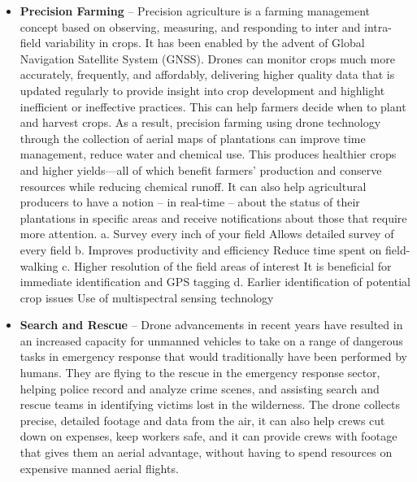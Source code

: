 \begin{itemize}
    \item \textbf{Precision Farming} -- Precision agriculture is a farming management concept based on observing, measuring, and responding to inter and intra-field variability in crops. It has been enabled by the advent of Global Navigation Satellite System (GNSS). Drones can monitor crops much more accurately, frequently, and affordably, delivering higher quality data that is updated regularly to provide insight into crop development and highlight inefficient or ineffective practices. This can help farmers decide when to plant and harvest crops.
    As a result, precision farming using drone technology through the collection of aerial maps of plantations can improve time management, reduce water and chemical use. This produces healthier crops and higher yields—all of which benefit farmers' production and conserve resources while reducing chemical runoff. It can also help agricultural producers to have a notion -- in real-time -- about the status of their plantations in specific areas and receive notifications about those that require more attention.
        a. Survey every inch of your field
        Allows detailed survey of every field
        b. Improves productivity and efficiency 
        Reduce time spent on field-walking
        c. Higher resolution of the field areas of interest 
        It is beneficial for immediate identification and GPS tagging
        d. Earlier identification of potential crop issues
        Use of multispectral sensing technology

    \item \textbf{Search and Rescue} -- Drone advancements in recent years have resulted in an increased capacity for unmanned vehicles to take on a range of dangerous tasks in emergency response that would traditionally have been performed by humans.
    They are flying to the rescue in the emergency response sector, helping police record and analyze crime scenes, and assisting search and rescue teams in identifying victims lost in the wilderness.
    The drone collects precise, detailed footage and data from the air, it can also help crews cut down on expenses, keep workers safe, and it can provide crews with footage that gives them an aerial advantage, without having to spend resources on expensive manned aerial flights. 


\end{itemize}
